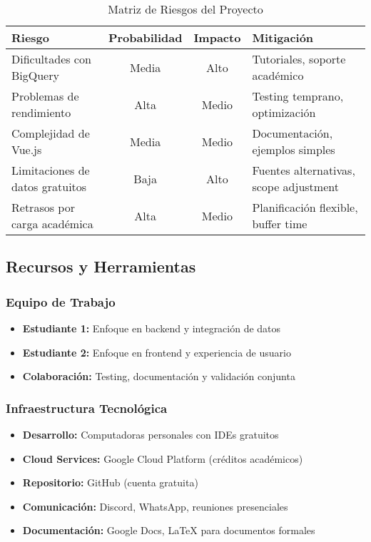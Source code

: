 \begin{table}[H]
    \centering
    \small
    \begin{tabular}{|l|c|c|l|}
        \hline
        \textbf{Riesgo} & \textbf{Probabilidad} & \textbf{Impacto} & \textbf{Mitigación} \\
        \hline
        Dificultades con BigQuery & Media & Alto & Tutoriales, soporte académico \\
        \hline
        Problemas de rendimiento & Alta & Medio & Testing temprano, optimización \\
        \hline
        Complejidad de Vue.js & Media & Medio & Documentación, ejemplos simples \\
        \hline
        Limitaciones de datos gratuitos & Baja & Alto & Fuentes alternativas, scope adjustment \\
        \hline
        Retrasos por carga académica & Alta & Medio & Planificación flexible, buffer time \\
        \hline
    \end{tabular}
    \caption{Matriz de Riesgos del Proyecto}
    \label{tab:riesgos}
\end{table}

\subsection{Recursos y Herramientas}

\subsubsection{Equipo de Trabajo}
\begin{itemize}
    \item \textbf{Estudiante 1:} Enfoque en backend y integración de datos
    \item \textbf{Estudiante 2:} Enfoque en frontend y experiencia de usuario
    \item \textbf{Colaboración:} Testing, documentación y validación conjunta
\end{itemize}

\subsubsection{Infraestructura Tecnológica}
\begin{itemize}
    \item \textbf{Desarrollo:} Computadoras personales con IDEs gratuitos
    \item \textbf{Cloud Services:} Google Cloud Platform (créditos académicos)
    \item \textbf{Repositorio:} GitHub (cuenta gratuita)
    \item \textbf{Comunicación:} Discord, WhatsApp, reuniones presenciales
    \item \textbf{Documentación:} Google Docs, LaTeX para documentos formales
\end{itemize}

